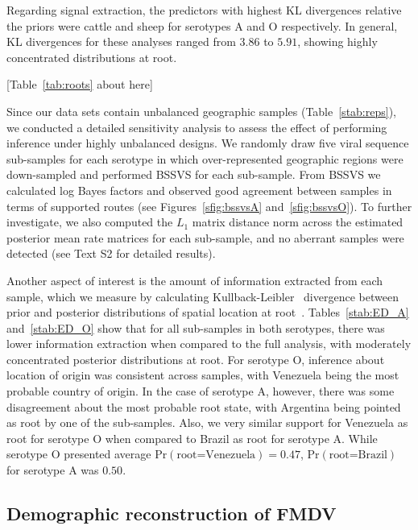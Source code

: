 \documentclass[10pt]{article}
\begin{document}
Regarding signal extraction, the predictors with highest KL divergences relative the priors were cattle and sheep for serotypes A and O respectively.
In general, KL divergences for these analyses ranged from $3.86$ to $5.91$, showing highly concentrated distributions at root. 

\begin{center}
 [Table~\ref{tab:roots} about here]
\end{center}

Since our data sets contain unbalanced geographic samples (Table~\ref{stab:reps}), we conducted a detailed sensitivity analysis to assess the effect of performing inference under highly unbalanced designs.
We randomly draw five viral sequence sub-samples for each serotype in which over-represented geographic regions were down-sampled and performed BSSVS for each sub-sample.
From BSSVS we calculated log Bayes factors and observed good agreement between samples in terms of supported routes (see Figures~\ref{sfig:bssvsA} and~\ref{sfig:bssvsO}).
To further investigate, we also computed the $L_1$ matrix distance norm across the estimated posterior mean rate matrices for each sub-sample, and no aberrant samples were detected (see Text S2 for detailed results).

Another aspect of interest is the amount of information extracted from each sample, which we measure by calculating Kullback-Leibler~\cite{KL} divergence between prior and posterior distributions of spatial location at root~\cite{roots}.
Tables~\ref{stab:ED_A} and~\ref{stab:ED_O} show that for all sub-samples in both serotypes, there was lower information extraction when compared to the full analysis, with moderately concentrated posterior distributions at root.
For serotype O, inference about location of origin was consistent across samples, with Venezuela being the most probable country of origin.
In the case of serotype A, however, there was some disagreement about the most probable root state, with Argentina being pointed as root by one of the sub-samples.
Also, we very similar support for Venezuela as root for serotype O when compared to Brazil as root for serotype A.
While serotype O presented average $\mbox{Pr}(\text{root=Venezuela})=0.47$, $\mbox{Pr}(\text{root=Brazil})$ for serotype A was $0.50$.

\subsection*{Demographic reconstruction of FMDV}
\end{document}
